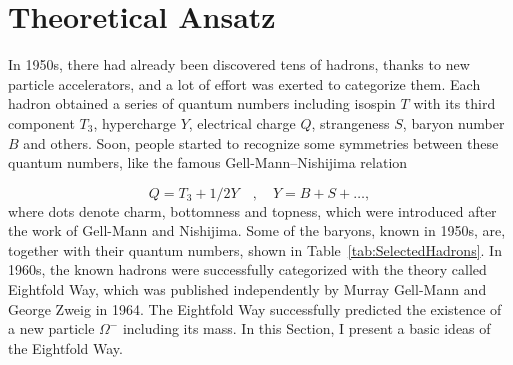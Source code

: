 \section{Theoretical Ansatz}
\label{Sec:TheoreticalAnsatz}

In 1950s, there had already been discovered tens of hadrons, thanks to new
particle accelerators, and a lot of effort was exerted to categorize them. 
Each hadron obtained a series of quantum numbers including isospin $T$ with
its third component $T_3$, hypercharge $Y$, electrical charge $Q$, strangeness
$S$, baryon number $B$ and others. 
Soon, people started to recognize some symmetries between these quantum numbers,
like the famous Gell-Mann--Nishijima relation
\cite{GellMannNishijima1,GellMannNishijima2}

\begin{equation}
  Q = T_3 + 1/2 Y \quad , \quad Y = B + S + \dots,
  \label{ex:GellMannNishijima}
\end{equation}
where dots denote charm, bottomness and topness, which were introduced after the
work of Gell-Mann and Nishijima. 
Some of the baryons, known in 1950s, are, together with their quantum numbers,
shown in Table~\ref{tab:SelectedHadrons}. 
In 1960s, the known hadrons were successfully categorized with the theory called
Eightfold Way, which was published independently by Murray Gell-Mann
\cite{Gell-Mann:101798} and George Zweig \cite{Zweig:570209} in 1964. 
The Eightfold Way successfully predicted the existence of a new particle
$\Omega^{-}$ including its mass. 
In this Section, I present a basic ideas of the Eightfold Way.

